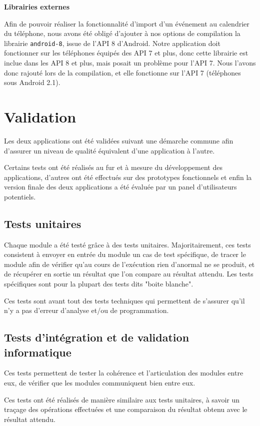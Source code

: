 \documentclass[a4paper, 11px]{article}
\begin{document}
{\bf Librairies externes}

Afin de pouvoir réaliser la fonctionnalité d'import d'un événement au calendrier du téléphone, nous avons été obligé d'ajouter à nos options de compilation la librairie \texttt{android-8}, issue de l'API 8 d'Android. Notre application doit fonctionner sur les téléphones équipés des API 7 et plus, donc cette librairie est inclue dans les API 8 et plus, mais posait un problème pour l'API 7. Nous l'avons donc rajouté lors de la compilation, et elle fonctionne sur l'API 7 (téléphones sous Android 2.1).


\section{Validation}
Les deux applications ont été validées suivant une démarche commune afin d'assurer un niveau de qualité équivalent d'une application à l'autre.

Certains tests ont été réalisés au fur et à mesure du développement des applications, d'autres ont été effectués sur des prototypes fonctionnels et enfin la version finale des deux applications a été évaluée par un panel d'utilisateurs potentiels.

\subsection{Tests unitaires}
Chaque module a été testé grâce à des tests unitaires. Majoritairement, ces tests consistent à envoyer en entrée du module un cas de test spécifique, de tracer le module afin de vérifier qu'au cours de l’exécution rien d'anormal ne se produit, et de récupérer en sortie un résultat que l'on compare au résultat attendu. Les tests spécifiques sont pour la plupart des tests dits "boite blanche".

Ces tests sont avant tout des tests techniques qui permettent de s'assurer qu'il n'y a pas d'erreur d'analyse et/ou de programmation.

\subsection{Tests d'intégration et de validation informatique}
Ces tests permettent de tester la cohérence et l'articulation des modules entre eux, de vérifier que les modules communiquent bien entre eux.


Ces tests ont été réalisés de manière similaire aux tests unitaires, à savoir un traçage des opérations effectuées et une comparaison du résultat obtenu avec le résultat attendu.
\end{document}
